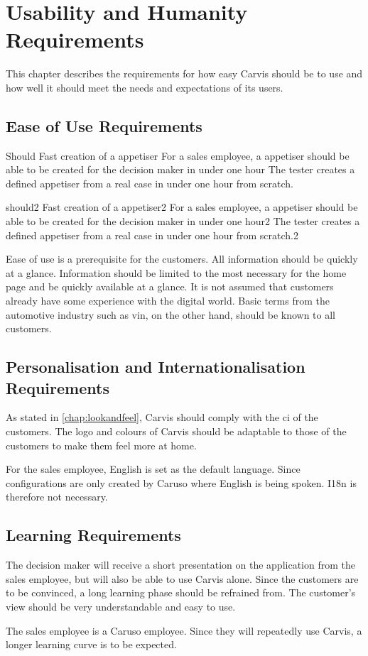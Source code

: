 \chapter{Usability and Humanity Requirements}
This chapter describes the requirements for how easy Carvis should be to use and how well it should meet the needs and expectations of its users.

\section{Ease of Use Requirements}

{Should}
{Fast creation of a \gls{appetiser}}
{For a sales employee, a \gls{appetiser} should be able to be created for the decision maker in under one hour}
{The tester creates a defined \gls{appetiser} from a real case in under one hour from scratch.}

\newline

{should2}
{Fast creation of a \gls{appetiser}2}
{For a sales employee, a \gls{appetiser} should be able to be created for the decision maker in under one hour2}
{The tester creates a defined \gls{appetiser} from a real case in under one hour from scratch.2}

Ease of use is a prerequisite for the customers. All information should be quickly at a glance. 
Information should be limited to the most necessary for the home page and be quickly available at a glance.
It is not assumed that customers already have some experience with the digital world. 
Basic terms from the automotive industry such as \gls{vin}, on the other hand, should be known to all customers.

\section{Personalisation and Internationalisation Requirements}


As stated in \autoref{chap:lookandfeel}, Carvis should comply with the \gls{ci} of the customers. The logo and colours of Carvis should be adaptable to those of the customers to make them feel more at home.

For the sales employee, English is set as the default language. Since configurations are only created by Caruso where English is being spoken. I18n is therefore not necessary.

\section{Learning Requirements}
The decision maker will receive a short presentation on the application from the sales employee, but will also be able to use Carvis alone. 
Since the customers are to be convinced, a long learning phase should be refrained from.
The customer's view should be very understandable and easy to use. 

The sales employee is a Caruso employee. Since they will repeatedly use Carvis, a longer learning curve is to be expected. 